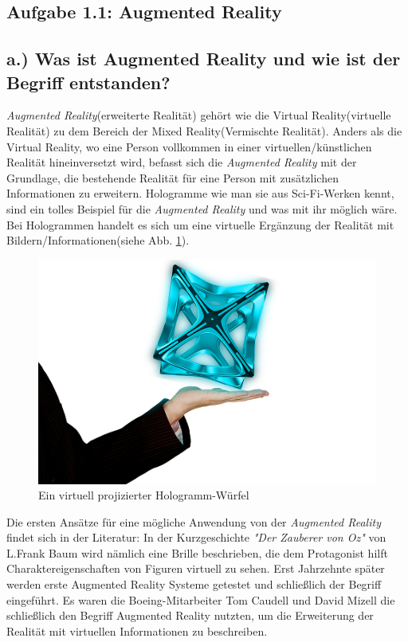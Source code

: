 \documentclass[12pt,utf8]{scrartcl}
\begin{document}
\thispagestyle{empty}
\tableofcontents
\newpage
\begin{flushleft}
\setcounter{page}{1}

\section*{\label{sec:thema}Aufgabe 1.1: Augmented Reality}
\subsection*{\label{sub:thema}a.) Was ist Augmented Reality und wie ist der Begriff entstanden?}

\textit{Augmented Reality}(erweiterte Realität) gehört wie die Virtual Reality(virtuelle Realität) zu dem Bereich der Mixed Reality(Vermischte Realität). Anders als die Virtual Reality, wo eine Person vollkommen in einer virtuellen/künstlichen Realität hineinversetzt wird, befasst sich die \textit{Augmented Reality} mit der Grundlage, die bestehende Realität für eine Person mit zusätzlichen Informationen zu erweitern\cite{PaulMilgram}. Hologramme wie man sie aus Sci-Fi-Werken kennt, sind ein tolles Beispiel für die \textit{Augmented Reality} und was mit ihr möglich wäre. Bei Hologrammen handelt es sich um eine virtuelle Ergänzung der Realität mit Bildern/Informationen(siehe Abb. \ref{fig:hologram}). 

\begin{figure}[H]
	\centering
	\includegraphics[width=0.8\linewidth]{images/hologram}
	\caption{Ein virtuell projizierter Hologramm-Würfel\cite{online4}}
	\label{fig:hologram}
\end{figure}


Die ersten Ansätze für eine mögliche Anwendung von der \textit{Augmented Reality} findet sich in der Literatur: In der Kurzgeschichte \textit{"Der Zauberer von Oz"} von L.Frank Baum wird nämlich eine Brille beschrieben, die dem Protagonist hilft Charaktereigenschaften von Figuren virtuell zu sehen\cite{onlineAR}. Erst Jahrzehnte später werden erste Augmented Reality Systeme getestet und schließlich der Begriff eingeführt. Es waren die Boeing-Mitarbeiter Tom Caudell und David Mizell die schließlich den Begriff Augmented Reality nutzten, um die Erweiterung der Realität mit virtuellen Informationen zu beschreiben\cite{TomDavid}.



\end{flushleft}
\end{document}

